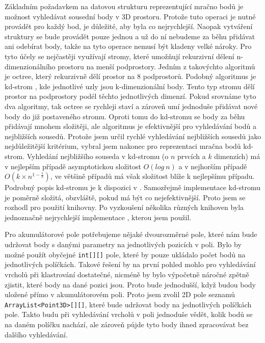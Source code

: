 \documentclass[11pt,twoside,a4paper]{book}
\begin{document}
Základním požadavkem na datovou strukturu reprezentující mračno bodů je možnost vyhledávat sousední body v 3D prostoru. Protože tuto operaci je nutné provádět pro každý bod, je důležité, aby byla co nejrychlejší. Naopak vytváření struktury se bude provádět pouze jednou a už do ní nebudeme za běhu přidávat ani odebírat body, takže na tyto operace nemusí být kladeny velké nároky. Pro tyto účely se nejčastěji využívají stromy, které umožňují rekurzivní dělení n-dimenzionálního prostoru na menší podprostory. Jedním z takovýchto algoritmů je octree, který rekurzivně dělí prostor na 8 podprostorů. Podobný algoritmus je kd-strom \cite{wiki:kdtree}, kde jednotlivé uzly jsou k-dimenzionální body. Tento typ stromu dělí prostor na podprostory podél těchto jednotlivých dimenzí. Pokud srovnáme tyto dva algoritmy, tak octree se rychleji staví a zároveň umí jednoduše přidávat nové body do již postaveného stromu. Oproti tomu do kd-stromu se body za běhu přidávají mnohem složitěji, ale algoritmus je efektivnější pro vyhledávání bodů a nejbližších sousedů. Protože jsem určil rychlé vyhledávání nejbližších sousedů jako nejdůležitější kritérium, vybral jsem nakonec pro reprezentaci mračna bodů kd-strom. Vyhledání nejbližšího souseda v kd-stromu (o $n$ prvcích a $k$ dimenzích) má v nejlepším případě asymptotickou složitost $O(log~n)$ a v nejhorším případě $O(k \times n^{1-\frac{1}{k}})$, ve většině případů má však složitost blíže k nejlepšímu případu. Podrobný popis kd-stromu je k dispozici v \cite{wiki:kdtree}. Samozřejmě implementace kd-stromu je poměrně složitá, obzvláště, pokud má být co nejefektivnější. Proto jsem se rozhodl pro použití knihovny. Po vyzkoušení několika různých knihoven byla jednoznačně nejrychlejší implementace \cite{kdtree}, kterou jsem použil.

Pro akumulátorové pole potřebujeme nějaké dvourozměrné pole, které nám bude udržovat body  s danými parametry na jednotlivých pozicích v poli. Bylo by možné použít obyčejné \verb|int[][]| pole, které by pouze ukládalo počet bodů na jednotlivých políčkách. Takové řešení by na první pohled mohlo pro vyhledávání vrcholů při klastrování dostatečné, nicméně by bylo výpočetně náročné zpětně zjistit, které body na dané pozici jsou. Proto bude jednodušší, když budou body uložené přímo v akumulátorovém poli. Proto jsem zvolil 2D pole seznamů \verb|ArrayList<Point3D>[][]|, které bude udržovat body na jednotlivých políčkách pole. Takto budu při vyhledávání vrcholů v poli jednoduše vědět, kolik bodů se na daném políčku nachází, ale zároveň půjde tyto body ihned zpracovávat bez dalšího vyhledávání. 
\end{document}
